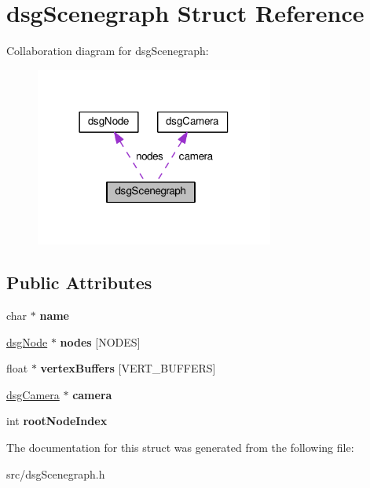 \hypertarget{structdsgScenegraph}{}\section{dsg\+Scenegraph Struct Reference}
\label{structdsgScenegraph}


Collaboration diagram for dsg\+Scenegraph\+:\nopagebreak
\begin{figure}[H]
\begin{center}
\leavevmode
\includegraphics[width=222pt]{structdsgScenegraph__coll__graph}
\end{center}
\end{figure}
\subsection*{Public Attributes}
\begin{DoxyCompactItemize}
\item 
\hypertarget{structdsgScenegraph_ae84072dbbf1a6f5d3c20c6442bb1d3ab}{}char $\ast$ {\bfseries name}\label{structdsgScenegraph_ae84072dbbf1a6f5d3c20c6442bb1d3ab}

\item 
\hypertarget{structdsgScenegraph_af33dae95c7349bf53cec34810986d143}{}\hyperlink{structdsgNode}{dsg\+Node} $\ast$ {\bfseries nodes} \mbox{[}N\+O\+D\+E\+S\mbox{]}\label{structdsgScenegraph_af33dae95c7349bf53cec34810986d143}

\item 
\hypertarget{structdsgScenegraph_a0fce9b8e25400d308f62f3ff89b90c4e}{}float $\ast$ {\bfseries vertex\+Buffers} \mbox{[}V\+E\+R\+T\+\_\+\+B\+U\+F\+F\+E\+R\+S\mbox{]}\label{structdsgScenegraph_a0fce9b8e25400d308f62f3ff89b90c4e}

\item 
\hypertarget{structdsgScenegraph_abed243793605c2d6630a8e9273719621}{}\hyperlink{structdsgCamera}{dsg\+Camera} $\ast$ {\bfseries camera}\label{structdsgScenegraph_abed243793605c2d6630a8e9273719621}

\item 
\hypertarget{structdsgScenegraph_a7d7454bf37c376750e43e88e467ba1a3}{}int {\bfseries root\+Node\+Index}\label{structdsgScenegraph_a7d7454bf37c376750e43e88e467ba1a3}

\end{DoxyCompactItemize}


The documentation for this struct was generated from the following file\+:\begin{DoxyCompactItemize}
\item 
src/dsg\+Scenegraph.\+h\end{DoxyCompactItemize}
